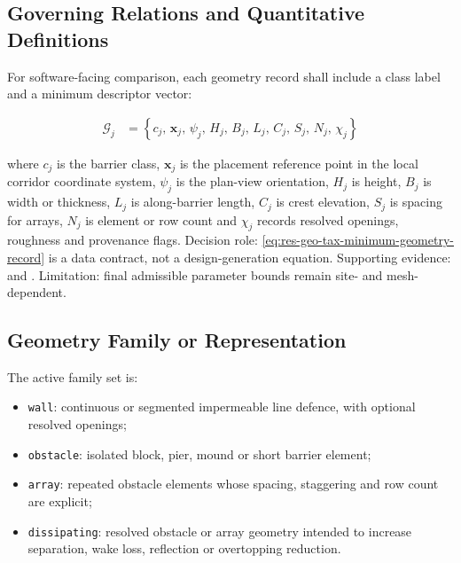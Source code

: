 \subsection{Governing Relations and Quantitative Definitions}
\label{sec:res-geo-tax-governing-relations}

For software-facing comparison, each geometry record shall include a
class label and a minimum descriptor vector:

\begin{align}
  \mathcal{G}_j
  &=
  \left\{
    c_j,\,
    \mathbf{x}_j,\,
    \psi_j,\,
    H_j,\,
    B_j,\,
    L_j,\,
    C_j,\,
    S_j,\,
    N_j,\,
    \chi_j
  \right\}
  \label{eq:res-geo-tax-minimum-geometry-record}
\end{align}

where $c_j$ is the barrier class, $\mathbf{x}_j$ is the placement
reference point in the local corridor coordinate system, $\psi_j$ is
the plan-view orientation, $H_j$ is height, $B_j$ is width or
thickness, $L_j$ is along-barrier length, $C_j$ is crest elevation,
$S_j$ is spacing for arrays, $N_j$ is element or row count and
$\chi_j$ records resolved openings, roughness and provenance flags.
Decision role: \cref{eq:res-geo-tax-minimum-geometry-record} is a data
contract, not a design-generation equation. Supporting evidence:
\textcite{deljesus2012porous} and \textcite{watanabe2022validation}.
Limitation: final admissible parameter bounds remain site- and
mesh-dependent.

\subsection{Geometry Family or Representation}
\label{sec:res-geo-tax-geometry-family-representation}

The active family set is:

\begin{itemize}
  \item \texttt{wall}: continuous or segmented impermeable line
    defence, with optional resolved openings;
  \item \texttt{obstacle}: isolated block, pier, mound or short
    barrier element;
  \item \texttt{array}: repeated obstacle elements whose spacing,
    staggering and row count are explicit;
  \item \texttt{dissipating}: resolved obstacle or array geometry
    intended to increase separation, wake loss, reflection or
    overtopping reduction.
\end{itemize}

